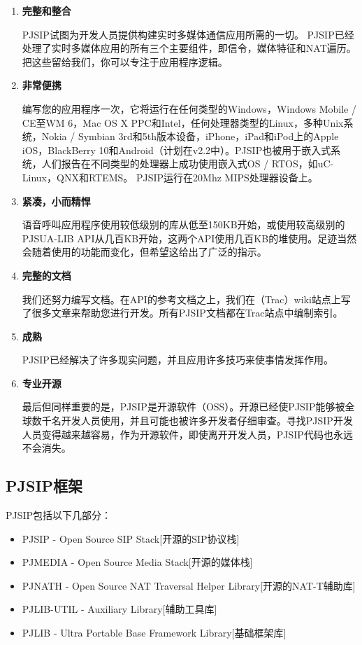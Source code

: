 \documentclass[a4paper,AutoFakeBold,oneside,12pt]{book}
\begin{document}
\begin{enumerate}
\item \textbf{完整和整合}

PJSIP试图为开发人员提供构建实时多媒体通信应用所需的一切。 PJSIP已经处理了实时多媒体应用的所有三个主要组件，即信令，媒体特征和NAT遍历。把这些留给我们，你可以专注于应用程序逻辑。
\item \textbf{非常便携}

编写您的应用程序一次，它将运行在任何类型的Windows，Windows Mobile / CE至WM 6，Mac OS X PPC和Intel，任何处理器类型的Linux，多种Unix系统，Nokia / Symbian 3rd和5th版本设备，iPhone，iPad和iPod上的Apple iOS，BlackBerry 10和Android（计划在v2.2中）。PJSIP也被用于嵌入式系统，人们报告在不同类型的处理器上成功使用嵌入式OS / RTOS，如uC-Linux，QNX和RTEMS。 PJSIP运行在20Mhz MIPS处理器设备上。
\item \textbf{紧凑，小而精悍}

语音呼叫应用程序使用较低级别的库从低至150KB开始，或使用较高级别的PJSUA-LIB API从几百KB开始，这两个API使用几百KB的堆使用。足迹当然会随着使用的功能而变化，但希望这给出了广泛的指示。
\item \textbf{完整的文档}

我们还努力编写文档。在API的参考文档之上，我们在（Trac）wiki站点上写了很多文章来帮助您进行开发。所有PJSIP文档都在Trac站点中编制索引。
\item \textbf{成熟}

PJSIP已经解决了许多现实问题，并且应用许多技巧来使事情发挥作用。
\item \textbf{专业开源}

最后但同样重要的是，PJSIP是开源软件（OSS）。开源已经使PJSIP能够被全球数千名开发人员使用，并且可能也被许多开发者仔细审查。寻找PJSIP开发人员变得越来越容易，作为开源软件，即使离开开发人员，PJSIP代码也永远不会消失。
\end{enumerate}

\subsection{PJSIP框架}
PJSIP包括以下几部分：

\begin{itemize}
\item PJSIP - Open Source SIP Stack[开源的SIP协议栈]
\item PJMEDIA - Open Source Media Stack[开源的媒体栈]
\item PJNATH - Open Source NAT Traversal Helper Library[开源的NAT-T辅助库]
\item PJLIB-UTIL - Auxiliary Library[辅助工具库]
\item PJLIB - Ultra Portable Base Framework Library[基础框架库]
\end{itemize}
\end{document}
